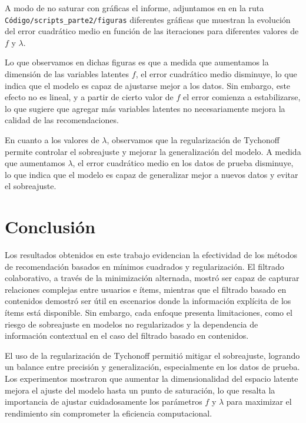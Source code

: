 \documentclass[12pt,a4paper]{article}
\begin{document}
A modo de no saturar con gráficas el informe, adjuntamos en en la ruta\\ \texttt{Código/scripts\_parte2/figuras} diferentes gráficas que muestran la evolución del error cuadrático medio en función de las iteraciones para diferentes valores de \( f \) y \( \lambda \).	

Lo que observamos en dichas figuras es que a medida que aumentamos la dimensión de las variables latentes \( f \), el error cuadrático medio disminuye, lo que indica que el modelo es capaz de ajustarse mejor a los datos. Sin embargo, este efecto no es lineal, y a partir de cierto valor de \( f \) el error comienza a estabilizarse, lo que sugiere que agregar más variables latentes no necesariamente mejora la calidad de las recomendaciones.

En cuanto a los valores de \( \lambda \), observamos que la regularización de Tychonoff permite controlar el sobreajuste y mejorar la generalización del modelo. A medida que aumentamos \( \lambda \), el error cuadrático medio en los datos de prueba disminuye, lo que indica que el modelo es capaz de generalizar mejor a nuevos datos y evitar el sobreajuste.


\section*{Conclusión}

Los resultados obtenidos en este trabajo evidencian la efectividad de los métodos de recomendación basados en mínimos cuadrados y regularización. El filtrado colaborativo, a través de la minimización alternada, mostró ser capaz de capturar relaciones complejas entre usuarios e ítems, mientras que el filtrado basado en contenidos demostró ser útil en escenarios donde la información explícita de los ítems está disponible. Sin embargo, cada enfoque presenta limitaciones, como el riesgo de sobreajuste en modelos no regularizados y la dependencia de información contextual en el caso del filtrado basado en contenidos.

El uso de la regularización de Tychonoff permitió mitigar el sobreajuste, logrando un balance entre precisión y generalización, especialmente en los datos de prueba. Los experimentos mostraron que aumentar la dimensionalidad del espacio latente mejora el ajuste del modelo hasta un punto de saturación, lo que resalta la importancia de ajustar cuidadosamente los parámetros \(f\) y \(\lambda\) para maximizar el rendimiento sin comprometer la eficiencia computacional.
\end{document}
